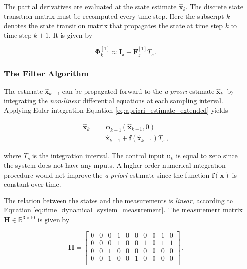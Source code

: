\noindent
The partial derivatives are evaluated at the state estimate $\hat{\mathbf{x}}_{k}$. The discrete state transition matrix must be recomputed every time step. Here the subscript $k$ denotes the state transition matrix that propagates the state at time step $k$ to time step $k+1$. It is given by 

\begin{equation}
  \bm{\Phi}^{[1]}_{k} \approx \mathbf{I}_{n} + \mathbf{F}^{[1]}_k T_s\,.
\end{equation}

\subsubsection{The Filter Algorithm} 

The estimate $\hat{\mathbf{x}}_{k-1}$ can be propagated forward to the \emph{a priori} estimate $\hat{\mathbf{x}}^{-}_k$ by integrating the \emph{non-linear} differential equations at each sampling interval. Applying Euler integration Equation \ref{eq:apriori_estimate_extended} yields

\begin{equation}\label{eq:apriori_estimate_extended_model}
\begin{split}
	\hat{\mathbf{x}}^{-}_k &= \bm{\phi}_{k-1}(\hat{\mathbf{x}}_{k-1}, 0) \\
	&= \hat{\mathbf{x}}_{k-1} + \mathbf{f}(\hat{\mathbf{x}}_{k-1})T_s\,, 
\end{split} 
\end{equation}

\noindent
where $T_s$ is the integration interval. The control input $\mathbf{u}_k$ is equal to zero since the system does not have any inputs. A higher-order numerical integration procedure would not improve the \emph{a priori} estimate since the function $\mathbf{f}(\mathbf{x})$ is constant over time.

The relation between the states and the measurements is \emph{linear}, according to Equation \ref{eq:time_dynamical_system_measurement}. The measurement matrix $\mathbf{H} \in \mathbb{R}^{3 \times 10}$ is given by 

\begin{equation}
\mathbf{H} = \begin{bmatrix}
  0 & 0 & 0 & 1 & 0 & 0 & 0 & 0 & 1 & 0\\
  0 & 0 & 0 & 1 & 0 & 0 & 1 & 0 & 1 & 1\\
  0 & 0 & 1 & 0 & 0 & 0 & 0 & 0 & 0 & 0 \\
  0 & 0 & 1 & 0 & 0 & 1 & 0 & 0 & 0 & 0\\
\end{bmatrix}\,.
\end{equation}

